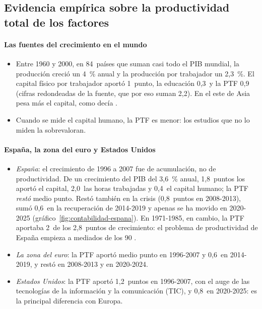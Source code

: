 \documentclass[11pt]{article}
\begin{document}
\subsection{Evidencia empírica sobre la productividad total de los factores}\label{sec:evidencia-ptf}

\paragraph{Las fuentes del crecimiento en el mundo}

\begin{itemize}
\item Entre 1960 y 2000, en 84~países que suman casi todo el PIB mundial, la producción creció un 4~\% anual y la producción por trabajador un 2,3~\%. El capital físico por trabajador aportó 1~punto, la educación 0,3~y la PTF 0,9 (cifras redondeadas de la fuente, que por eso suman 2,2)\nocite{BosworthCollins2003}. En el este de Asia pesa más el capital, como decía \textcite{Young1995}.
\item Cuando se mide el capital humano, la PTF es menor: los estudios que no lo miden la sobrevaloran\nocite{Jorgenson1995}.
\end{itemize}

\paragraph{España, la zona del euro y Estados Unidos}

\begin{itemize}
\item \emph{España}: el crecimiento de 1996 a 2007 fue de acumulación, no de productividad. De un crecimiento del PIB del 3,6~\% anual, 1,8~puntos los aportó el capital, 2,0~las horas trabajadas y 0,4~el capital humano; la PTF \emph{restó} medio punto. Restó también en la crisis (0,8~puntos en 2008-2013), sumó 0,6~en la recuperación de 2014-2019 y apenas se ha movido en 2020-2025\nocite{CE2026AMECO,GGDC2025PWT} (gráfico~\ref{fig:contabilidad-espana}). En 1971-1985, en cambio, la PTF aportaba 2~de los 2,8~puntos de crecimiento: el problema de productividad de España empieza a mediados de los 90 .
\item \emph{La zona del euro}: la PTF aportó medio punto en 1996-2007 y 0,6~en 2014-2019, y restó en 2008-2013 y en 2020-2024\nocite{CE2026AMECO,GGDC2025PWT}.
\item \emph{Estados Unidos}: la PTF aportó 1,2~puntos en 1996-2007, con el auge de las tecnologías de la información y la comunicación (TIC), y 0,8~en 2020-2025: es la principal diferencia con Europa\nocite{CE2026AMECO}.
\end{itemize}
\end{document}
